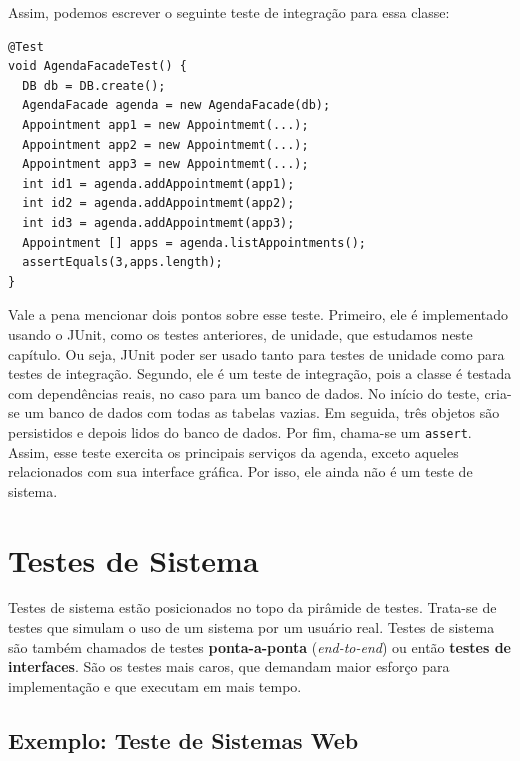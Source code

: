 \documentclass[
  11pt,
  twoside]{book}
\newcommand{\passthrough}[1]{#1}
\begin{document}
Assim, podemos escrever o seguinte teste de integração para essa classe:

\begin{lstlisting}
@Test
void AgendaFacadeTest() {
  DB db = DB.create();
  AgendaFacade agenda = new AgendaFacade(db);
  Appointment app1 = new Appointmemt(...);
  Appointment app2 = new Appointmemt(...);
  Appointment app3 = new Appointmemt(...);
  int id1 = agenda.addAppointmemt(app1);
  int id2 = agenda.addAppointmemt(app2);
  int id3 = agenda.addAppointmemt(app3);
  Appointment [] apps = agenda.listAppointments();
  assertEquals(3,apps.length);
}
\end{lstlisting}

Vale a pena mencionar dois pontos sobre esse teste. Primeiro, ele é
implementado usando o JUnit, como os testes anteriores, de unidade, que
estudamos neste capítulo. Ou seja, JUnit poder ser usado tanto para
testes de unidade como para testes de integração. Segundo, ele é um
teste de integração, pois a classe é testada com dependências reais, no
caso para um banco de dados. No início do teste, cria-se um banco de
dados com todas as tabelas vazias. Em seguida, três objetos são
persistidos e depois lidos do banco de dados. Por fim, chama-se um
\passthrough{\lstinline!assert!}. Assim, esse teste exercita os
principais serviços da agenda, exceto aqueles relacionados com sua
interface gráfica. Por isso, ele ainda não é um teste de sistema.

\hypertarget{testes-de-sistema}{%
\section{Testes de Sistema}\label{testes-de-sistema}}

 

Testes de sistema estão posicionados no topo da pirâmide de testes.
Trata-se de testes que simulam o uso de um sistema por um usuário real.
Testes de sistema são também chamados de testes \textbf{ponta-a-ponta}
(\emph{end-to-end}) ou então \textbf{testes de interfaces}. São os
testes mais caros, que demandam maior esforço para implementação e que
executam em mais tempo.

\hypertarget{exemplo-teste-de-sistemas-web}{%
\subsection{Exemplo: Teste de Sistemas
Web}\label{exemplo-teste-de-sistemas-web}}
\end{document}
